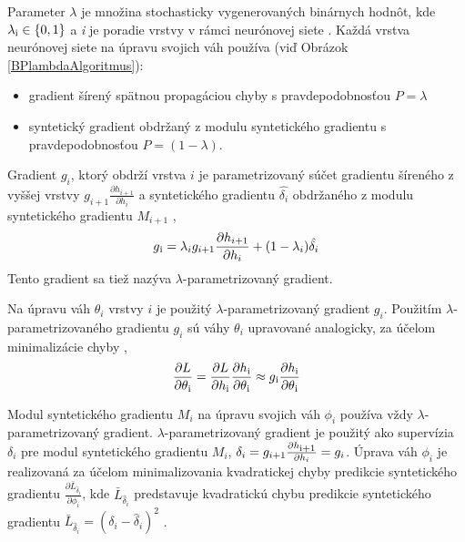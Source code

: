 Parameter $\lambda$ je množina stochasticky vygenerovaných binárnych hodnôt, kde $\lambda\textsubscript{i}\in\{0, 1\}$ a \textit{i} je poradie vrstvy v rámci neurónovej siete \cite{Jaderberg2016}. Každá vrstva neurónovej siete na úpravu svojich váh používa (viď Obrázok \ref{BPlambdaAlgoritmus}):
\begin{itemize}
    \item gradient šírený spätnou propagáciou chyby s pravdepodobnosťou $P=\lambda$
    \item syntetický gradient obdržaný z modulu syntetického gradientu s pravdepodobnosťou $P=(1-\lambda)$.
\end{itemize}
Gradient $g_i$, ktorý obdrží vrstva $i$ je parametrizovaný súčet gradientu šíreného z vyššej vrstvy $g_{i+1}\frac{\partial h_{i+1}}{\partial h_i}$ a syntetického gradientu $\hat{\delta_i}$ obdržaného z modulu syntetického gradientu $M_{i+1}$ \cite{Jaderberg2016},
\begin{equation}
\label{lambdaParametrizedGradient}
    g\textsubscript{i}=\lambda_i g_{i+1} \frac{\partial h_{i+1}}{\partial h_i}+(1-\lambda_i)\hat{\delta_i}
\end{equation}
Tento gradient sa tiež nazýva $\lambda$-parametrizovaný gradient.

Na úpravu váh $\theta_i$ vrstvy $i$ je použitý $\lambda$-parametrizovaný gradient $g_i$. Použitím $\lambda$-parametrizovaného gradientu $g_i$ sú váhy $\theta_i$ upravované analogicky, za účelom minimalizácie chyby \cite{Jaderberg2016},
\begin{equation}
    \frac{\partial L}{\partial \theta\textsubscript{i}}=\frac{\partial L}{\partial h\textsubscript{i}}\frac{\partial h\textsubscript{i}}{\partial\theta\textsubscript{i}}\approx g\textsubscript{i}\frac{\partial h\textsubscript{i}}{\partial \theta\textsubscript{i}}
\end{equation}

Modul syntetického gradientu $M_i$ na úpravu svojich váh $\phi_{i}$ používa vždy $\lambda$-parametrizovaný gradient. $\lambda$-parametrizovaný gradient je použitý ako supervízia $\delta_i$ pre modul syntetického gradientu $M_i$, $\delta_i=g_{i+1}\frac{\partial h\textsubscript{i+1}}{\partial h_i}=g_i$. Úprava váh $\phi_i$ je realizovaná za účelom minimalizovania kvadratickej chyby predikcie syntetického gradientu $\frac{\partial\bar{L}_{\hat{\delta}_i}}{\partial\phi_i}$, kde $\bar{L}_{\hat{\delta}_i}$ predstavuje kvadratickú chybu predikcie syntetického gradientu $\bar{L}_{\hat{\delta}_i}=(\delta_i-\hat{\delta}_i)^2$ \cite{Jaderberg2016}.

